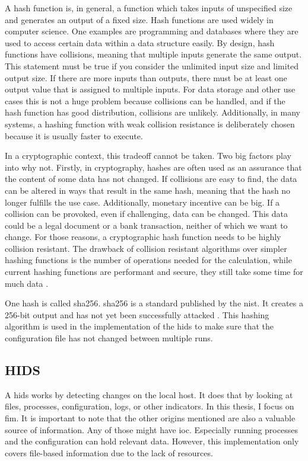 A hash function is, in general, a function which takes inputs of unspecified size and generates an output of a fixed size. Hash functions are used widely in computer science. One examples are programming and databases where they are used to access certain data within a data structure easily. By design, hash functions have \glspl{collision}, meaning that multiple inputs generate the same output. This statement must be true if you consider the unlimited input size and limited output size. If there are more inputs than outputs, there must be at least one output value that is assigned to multiple inputs. For data storage and other use cases this is not a huge problem because collisions can be handled, and if the hash function has good distribution, collisions are unlikely. Additionally, in many systems, a hashing function with weak collision resistance is deliberately chosen because it is usually faster to execute. \cite{hash:noncrypto, hash:slow}

In a cryptographic context, this tradeoff cannot be taken. Two big factors play into why not. Firstly, in cryptography, hashes are often used as an assurance that the content of some data has not changed. If collisions are easy to find, the data can be altered in ways that result in the same hash, meaning that the hash no longer fulfills the use case. Additionally, monetary incentive can be big. If a collision can be provoked, even if challenging, data can be changed. This data could be a legal document or a bank transaction, neither of which we want to change. For those reasons, a cryptographic hash function needs to be highly collision resistant. The drawback of collision resistant algorithms over simpler hashing functions is the number of operations needed for the calculation, while current hashing functions are performant and secure, they still take some time for much data \cite{crypto}.

One \gls{hash} is called \gls{sha256}. \gls{sha256} is a standard published by the \gls{nist}. It creates a 256-bit output and has not yet been successfully attacked \cite{sha, crypto}. This hashing algorithm is used in the implementation of the \gls{hids} to make sure that the configuration file has not changed between multiple runs.


\subsection{HIDS}
\label{sec:def:hids}

A \gls{hids} works by detecting changes on the local host. It does that by looking at files, processes, configuration, logs, or other indicators. In this thesis, I focus on \gls{fim}. It is important to note that the other origins mentioned are also a valuable source of information. Any of those might have \gls{ioc}. Especially running processes and the configuration can hold relevant data. However, this implementation only covers file-based information due to the lack of resources.


